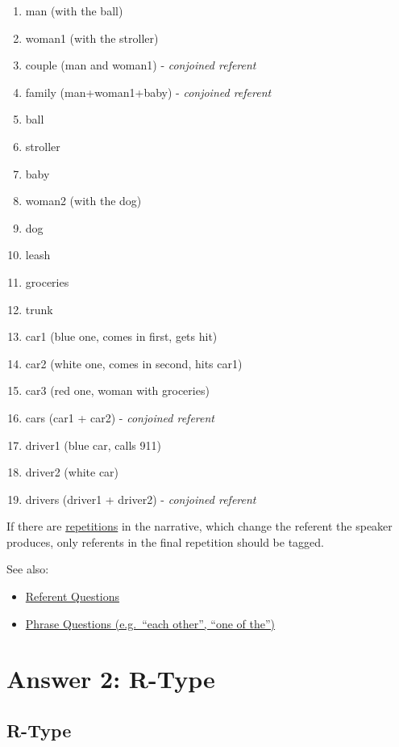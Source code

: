 \documentclass[
]{book}
\providecommand{\tightlist}{%
  \setlength{\itemsep}{0pt}\setlength{\parskip}{0pt}}
\begin{document}
\begin{enumerate}
\def\labelenumi{\arabic{enumi}.}
\tightlist
\item
  man (with the ball)
\item
  woman1 (with the stroller)
\item
  couple (man and woman1) - \emph{conjoined referent}
\item
  family (man+woman1+baby) - \emph{conjoined referent}
\item
  ball
\item
  stroller
\item
  baby
\item
  woman2 (with the dog)
\item
  dog
\item
  leash
\item
  groceries
\item
  trunk
\item
  car1 (blue one, comes in first, gets hit)
\item
  car2 (white one, comes in second, hits car1)
\item
  car3 (red one, woman with groceries)
\item
  cars (car1 + car2) - \emph{conjoined referent}
\item
  driver1 (blue car, calls 911)
\item
  driver2 (white car)
\item
  drivers (driver1 + driver2) - \emph{conjoined referent}
\end{enumerate}

If there are \protect\hyperlink{identifying-repitions}{repetitions} in the narrative,
which change the referent the speaker produces,
only referents in the final repetition should be tagged.

See also:

\begin{itemize}
\tightlist
\item
  \protect\hyperlink{referents-1}{Referent Questions}
\item
  \protect\hyperlink{phrases}{Phrase Questions (e.g.~``each other'', ``one of the'')}
\end{itemize}

\hypertarget{answer-2-r-type}{%
\chapter{Answer 2: R-Type}\label{answer-2-r-type}}

\hypertarget{r-type}{%
\section{R-Type}\label{r-type}}
\end{document}
